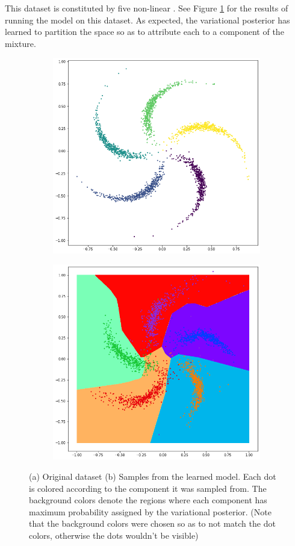 This dataset is constituted by five non-linear . See Figure \ref{fig:pinwheel}
for the results of running the model on this dataset. As expected, the variational
posterior has learned to partition the space so as to attribute each  to
a component of the mixture. 
\begin{figure}
\centering
  \begin{subfigure}[t]{.5\textwidth}
    \raggedleft
    \includegraphics[width=0.6\linewidth]{figures/original_pinwheel.png}
  \end{subfigure}%
  \begin{subfigure}[t]{.5\textwidth}
    \raggedright
    \includegraphics[width=0.6\linewidth]{figures/trained_pinwheel.png}
  \end{subfigure}
  \caption{\scriptsize (a) Original dataset (b) Samples from the learned model. Each
dot is colored according to the component it was sampled from. The background
colors denote the regions where each component has maximum probability assigned
by the variational posterior. (Note that the background colors were chosen
so as to not match the dot colors, otherwise the dots wouldn't be visible)}
  \label{fig:pinwheel}
\end{figure}

